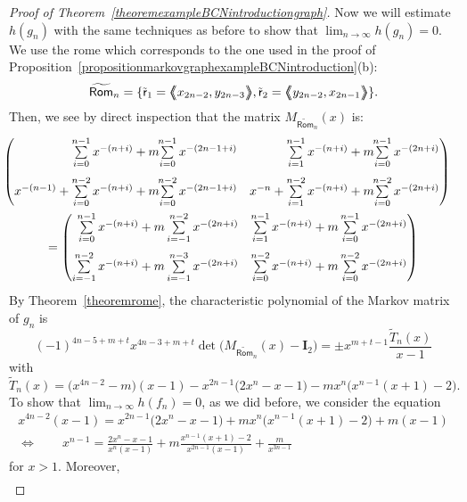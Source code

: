 \documentclass[a4paper, 11pt]{amsart}
\numberwithin{equation}{section}
\theoremstyle{customnumberedtheorem}
\theoremstyle{definitionwithbfnote}
\newcommand{\BIgraph}[1]{\ensuremath{\mathopen{\bigl\langle\mkern-7.8mu\bigl\langle\mspace{-6.5mu}\bigl\langle} #1 \mathclose{\bigr\rangle\mspace{-6.5mu}\bigr\rangle\mkern-7.8mu\bigr\rangle}}}
\begin{document}
\begin{proof}[Proof of Theorem~\ref{theoremexampleBCNintroductiongraph}]
Now we will estimate $h(g_n)$ with the same techniques as before
to show that $\lim_{n\to\infty} h(g_n) = 0.$
We use the rome which corresponds to the one used in the proof of
Proposition~\ref{propositionmarkovgraphexampleBCNintroduction}(b):
\[
\widetilde{\textsf{Rom}}_n = \{\tilde{\textsf{r}}_1 = \BIgraph{x_{2n-2},y_{2n-3}}, \tilde{\textsf{r}}_2 = \BIgraph{y_{2n-2},x_{2n-1}}\}.
\]
Then, we see by direct inspection that the matrix $M_{\widetilde{\textsf{Rom}}_n}(x)$ is:
{\small\begin{multline*}
 \hspace*{-1em}\begin{pmatrix*}[r]
   \sum\limits_{i=0}^{n-1} x^{-(n+i)} + m\mkern-5mu \sum\limits_{i=0}^{n-1} x^{-(2n-1+i)}             & \sum\limits_{i=1}^{n-1}x^{-(n+i)} + m\mkern-5mu\sum\limits_{i=0}^{n-1} x^{-(2n+i)}\\[3ex]
   x^{-(n-1)} + \sum\limits_{i=0}^{n-2} x^{-(n+i)} + m\mkern-5mu\sum\limits_{i=0}^{n-2} x^{-(2n-1+i)} & x^{-n} + \sum\limits_{i=1}^{n-2}x^{-(n+i)} + m\mkern-5mu\sum\limits_{i=0}^{n-2} x^{-(2n+i)}
\end{pmatrix*}\\
= \begin{pmatrix*}[r]
   \sum\limits_{i=0}^{n-1} x^{-(n+i)} + m \sum\limits_{i=-1}^{n-2} x^{-(2n+i)} & \sum\limits_{i=1}^{n-1}x^{-(n+i)} + m\sum\limits_{i=0}^{n-1} x^{-(2n+i)}\\[3ex]
   \sum\limits_{i=-1}^{n-2} x^{-(n+i)} + m\sum\limits_{i=-1}^{n-3} x^{-(2n+i)} & \sum\limits_{i=0}^{n-2}x^{-(n+i)} + m\sum\limits_{i=0}^{n-2} x^{-(2n+i)}
\end{pmatrix*}
\end{multline*}}
By Theorem~\ref{theoremrome}, the characteristic polynomial of
the Markov matrix of $g_n$ is
\[
 (-1)^{4n-5+m+t} x^{4n-3+m+t} \det\bigl(M_{\widetilde{\textsf{Rom}}_n}(x) - \mathbf{I}_{2}\bigr)
    = \pm x^{m+t-1}\frac{\widetilde{T}_n(x)}{x-1}
\]
with
\[
  \widetilde{T}_n(x)  = \bigl(x^{4n-2}-m\bigr)(x-1) - x^{2n-1}\bigl(2x^{n}-x-1\bigr) - m x^{n}\bigl(x^{n-1}(x+1)-2\bigr).
\]
To show that $\lim_{n\to\infty} h(f_n) = 0$, as we did before,
we consider the equation
\begin{multline*}
 x^{4n-2}(x-1) = x^{2n-1}\bigl(2x^{n}-x-1\bigr) + m x^{n}\bigl(x^{n-1}(x+1)-2\bigr) + m(x-1)\\
 \Longleftrightarrow\qquad
 x^{n-1} = \frac{2x^{n}-x-1}{x^n(x-1)} + m \frac{x^{n-1}(x+1)-2}{x^{2n-1}(x-1)} + \frac{m}{x^{3n-1}}
\end{multline*}
for $x > 1.$ Moreover,
\begin{multline*}

\end{multline*}
\end{proof}
\end{document}
